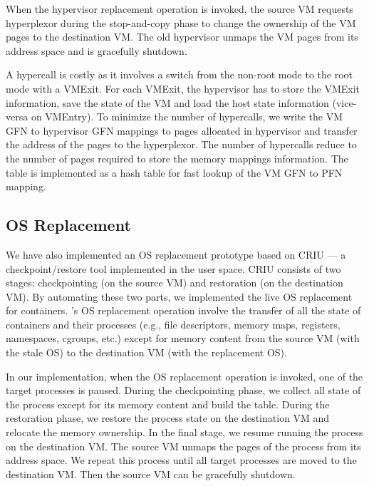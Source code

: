 When the hypervisor replacement operation is invoked, the source VM requests hyperplexor during the stop-and-copy phase to change the ownership of the VM pages to the destination VM. The old hypervisor unmaps the VM pages from its address space and is gracefully shutdown. 

A hypercall is costly as it involves a switch from the non-root mode to the root mode with a VMExit. For each VMExit, the hypervisor has to store the VMExit information, save the state of the VM and load the host state information (vice-versa on VMEntry). To minimize the number of hypercalls, we write the VM GFN to hypervisor GFN mappings to pages allocated in hypervisor and transfer the address of the pages to the hyperplexor. The number of hypercalls reduce to the number of pages required to store the memory mappings information. The \arch table is implemented as a hash table for fast lookup of the VM GFN to PFN mapping.

\subsection{OS Replacement}
We have also implemented an OS replacement prototype based on CRIU \cite{criu} --- a checkpoint/restore tool implemented in the user space. CRIU consists of two stages: checkpointing (on the source VM) and restoration (on the destination VM). By automating these two parts, we implemented the live OS replacement for containers. \arch's OS replacement operation involve the transfer of all the state of containers and their processes (e.g., file descriptors, memory maps, registers, namespaces, cgroups, etc.) except for memory content from the source VM (with the stale OS) to the destination VM (with the replacement OS).

In our implementation, when the OS replacement operation is invoked, one of the target processes is paused. During the checkpointing phase, we collect all state of the process except for its memory content and build the \arch table. During the restoration phase, we restore the process state on the destination VM and relocate the memory ownership. In the final stage, we resume running the process on the destination VM. The source VM unmaps the pages of the process from its address space. We repeat this process until all target processes are moved to the destination VM. Then the source VM can be gracefully shutdown. 

